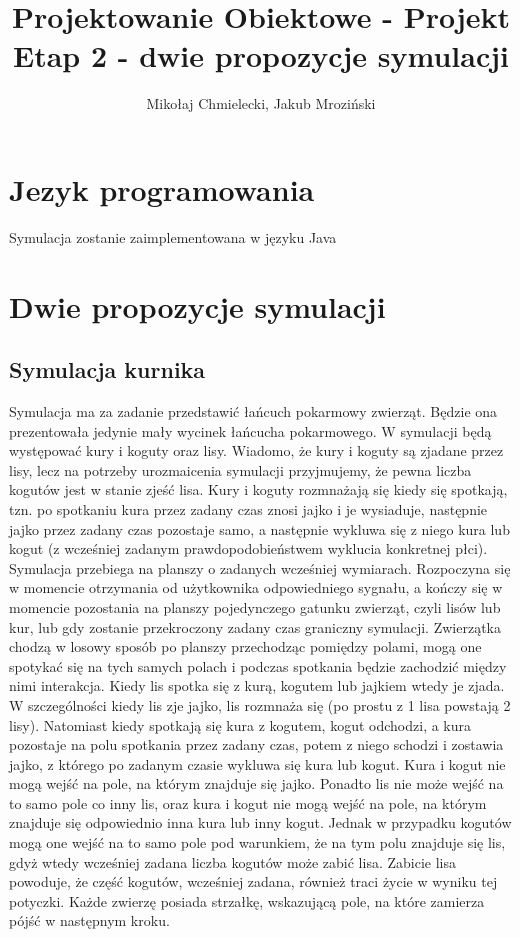 \documentclass[10pt,a4paper]{article}
\author{Mikołaj Chmielecki, Jakub Mroziński}
\title{Projektowanie Obiektowe - Projekt\\Etap 2 - dwie propozycje symulacji}
\begin{document}
\maketitle
	\section{Jezyk programowania}
		Symulacja zostanie zaimplementowana w języku Java
	\section{Dwie propozycje symulacji}
		\subsection{Symulacja kurnika}
			\indent	
			Symulacja ma za zadanie przedstawić łańcuch pokarmowy zwierząt. Będzie ona prezentowała jedynie mały wycinek łańcucha pokarmowego. W symulacji będą występować kury i koguty oraz lisy. Wiadomo, że kury i koguty są zjadane przez lisy, lecz na potrzeby urozmaicenia symulacji przyjmujemy, że pewna liczba kogutów jest w stanie zjeść lisa. Kury i koguty rozmnażają się kiedy się spotkają, tzn. po spotkaniu kura przez zadany czas znosi jajko i je wysiaduje, następnie jajko przez zadany czas pozostaje samo, a następnie wykluwa się z niego kura lub kogut (z wcześniej zadanym prawdopodobieństwem wyklucia konkretnej płci). \\
			\indent
Symulacja przebiega na planszy o zadanych wcześniej wymiarach. Rozpoczyna się w momencie otrzymania od użytkownika odpowiedniego sygnału, a kończy się w momencie pozostania na planszy pojedynczego gatunku zwierząt, czyli lisów lub kur, lub gdy zostanie przekroczony zadany czas graniczny symulacji. Zwierzątka chodzą w losowy sposób po planszy przechodząc pomiędzy polami, mogą one spotykać się na tych samych polach i podczas spotkania będzie zachodzić między nimi interakcja. Kiedy lis spotka się z kurą, kogutem lub jajkiem wtedy je zjada. W szczególności kiedy lis zje jajko, lis rozmnaża się (po prostu z 1 lisa powstają 2 lisy). Natomiast kiedy spotkają się kura z kogutem, kogut odchodzi, a kura pozostaje na polu spotkania przez zadany czas, potem z niego schodzi i zostawia jajko, z którego po zadanym czasie wykluwa się kura lub kogut. Kura i kogut nie mogą wejść na pole, na którym znajduje się jajko. Ponadto lis nie może wejść na to samo pole co inny lis, oraz kura i kogut nie mogą wejść na pole, na którym znajduje się odpowiednio inna kura lub inny kogut. Jednak w przypadku kogutów mogą one wejść na to samo pole pod warunkiem, że na tym polu znajduje się lis, gdyż wtedy wcześniej zadana liczba kogutów może zabić lisa. Zabicie lisa powoduje, że część kogutów, wcześniej zadana, również traci życie w wyniku tej potyczki. Każde zwierzę posiada strzałkę, wskazującą pole, na które zamierza pójść w następnym kroku. \\
\end{document}
